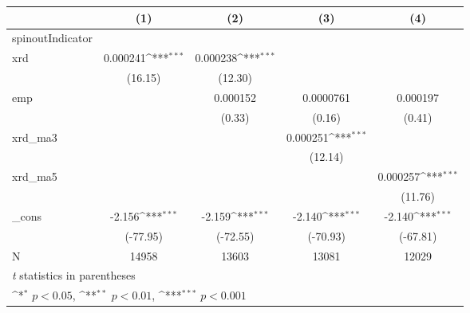 {
\def\sym#1{\ifmmode^{#1}\else\(^{#1}\)\fi}
\begin{tabular}{l*{4}{c}}
\hline\hline
            &\multicolumn{1}{c}{(1)}         &\multicolumn{1}{c}{(2)}         &\multicolumn{1}{c}{(3)}         &\multicolumn{1}{c}{(4)}         \\
\hline
spinoutIndicator&                     &                     &                     &                     \\
xrd         &    0.000241\sym{***}&    0.000238\sym{***}&                     &                     \\
            &     (16.15)         &     (12.30)         &                     &                     \\
[1em]
emp         &                     &    0.000152         &   0.0000761         &    0.000197         \\
            &                     &      (0.33)         &      (0.16)         &      (0.41)         \\
[1em]
xrd\_ma3     &                     &                     &    0.000251\sym{***}&                     \\
            &                     &                     &     (12.14)         &                     \\
[1em]
xrd\_ma5     &                     &                     &                     &    0.000257\sym{***}\\
            &                     &                     &                     &     (11.76)         \\
[1em]
\_cons      &      -2.156\sym{***}&      -2.159\sym{***}&      -2.140\sym{***}&      -2.140\sym{***}\\
            &    (-77.95)         &    (-72.55)         &    (-70.93)         &    (-67.81)         \\
\hline
N           &       14958         &       13603         &       13081         &       12029         \\
\hline\hline
\multicolumn{5}{l}{\footnotesize \textit{t} statistics in parentheses}\\
\multicolumn{5}{l}{\footnotesize \sym{*} \(p<0.05\), \sym{**} \(p<0.01\), \sym{***} \(p<0.001\)}\\
\end{tabular}
}
